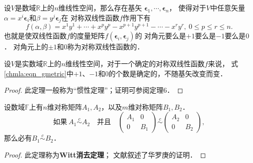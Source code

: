 \begin{corollary}\label{chmla:thm_pm1num}
    设$V$是数域$\mathbb{R}$上的$n$维线性空间，那么存在基矢
    $\boldsymbol{\epsilon}_1,\cdots,\boldsymbol{\epsilon}_n$，
    使得对于$V$中任意矢量
    $\alpha = x^i \boldsymbol{\epsilon}_i$和$\beta = y^j \boldsymbol{\epsilon}_j$在
    对称双线性函数$f$作用下有
    \begin{equation}\label{chmla:eqn_gmetric}
        f(\alpha,\beta)= x^1 y^1 + \cdots + x^p y^p
        -x^{p+1} y^{p+1} - \cdots - x^r y^r, \
        0 \leqslant p \leqslant r \leqslant n.
    \end{equation}
    也就是使双线性函数$f$的度量矩阵$f(\boldsymbol{\epsilon}_i,\boldsymbol{\epsilon}_j)$的
    对角元要么是$+1$要么是$-1$要么是$0$．
    对角元上的$\pm 1$和$0$称为对称双线性函数的． 
\end{corollary}
\begin{theorem}\label{chmla:thm_pm1num-fix}
    设$V$是实数域$\mathbb{R}$上的$n$维线性空间，对于一个确定的对称双线性函数$f$来说，
    式\eqref{chmla:eqn_gmetric}中$+1$、$-1$和$0$的个数是确定的，不随基矢改变而变．
\end{theorem}
\begin{proof}
    此定理一般称为“惯性定理”；证明可参阅\parencite[p.432]{qiuws-2019-v2}定理6．
\end{proof}


\begin{theorem}\label{chmla:thm_Witt-cancel}
    设数域$\mathbb{F}$上有$n$维对称矩阵$A_1,A_2$，以及$m$维对称矩阵$B_1,B_2$．
    \begin{equation}\label{chmla:eqn_Witt-cancel}
        \text{如果}\ A_1 \overset{c}{\sim} A_2 \quad \text{并且} \quad 
        \begin{pmatrix}  A_1 &0 \\ 0 & B_1  \end{pmatrix} \overset{c}{\sim}
        \begin{pmatrix}  A_2 &0 \\ 0 & B_2  \end{pmatrix},
    \end{equation}
    那么必有$B_1 \overset{c}{\sim} B_2$．
\end{theorem}
\begin{proof}
    此定理称为{\heiti \bfseries Witt消去定理}；
    文献\parencite[p.433]{qiuws-2019-v2}叙述了华罗庚的证明．
\end{proof}


